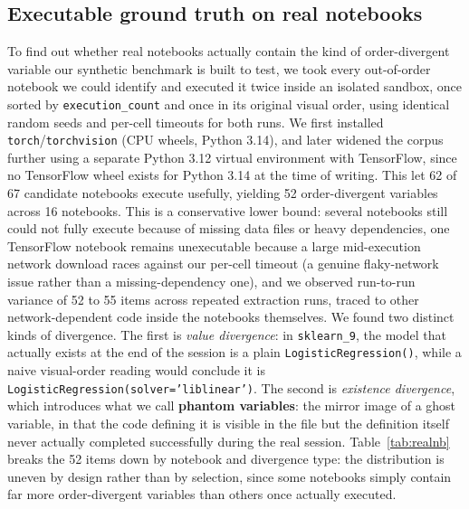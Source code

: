 \documentclass[11pt]{article}
\begin{document}
\subsection{Executable ground truth on real notebooks}
\label{sec:realnb}
To find out whether real notebooks actually contain the kind of
order-divergent variable our synthetic benchmark is built to test, we
took every out-of-order notebook we could identify and executed it twice
inside an isolated sandbox, once sorted by \texttt{execution\_count} and
once in its original visual order, using identical random seeds and
per-cell timeouts for both runs. We first installed
\texttt{torch}/\texttt{torchvision} (CPU wheels, Python 3.14), and later
widened the corpus further using a separate Python 3.12 virtual
environment with TensorFlow, since no TensorFlow wheel exists for Python
3.14 at the time of writing. This let 62 of 67 candidate notebooks
execute usefully, yielding 52 order-divergent variables across 16
notebooks. This is a conservative lower bound: several notebooks still
could not fully execute because of missing data files or heavy
dependencies, one TensorFlow notebook remains unexecutable because a
large mid-execution network download races against our per-cell timeout
(a genuine flaky-network issue rather than a missing-dependency one), and
we observed run-to-run variance of 52 to 55 items across repeated
extraction runs, traced to other network-dependent code inside the
notebooks themselves. We found two distinct kinds of divergence. The
first is \emph{value divergence}: in \texttt{sklearn\_9}, the model that
actually exists at the end of the session is a plain
\texttt{LogisticRegression()}, while a naive visual-order reading would
conclude it is
\texttt{LogisticRegression(solver='liblinear')}. The second is
\emph{existence divergence}, which introduces what we call
\textbf{phantom variables}: the mirror image of a ghost variable, in that
the code defining it is visible in the file but the definition itself
never actually completed successfully during the real session.
Table~\ref{tab:realnb} breaks the 52 items down by notebook and
divergence type: the distribution is uneven by design rather than by
selection, since some notebooks simply contain far more order-divergent
variables than others once actually executed.
\end{document}
